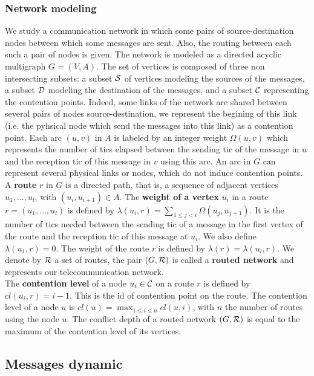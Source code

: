 \documentclass[english]{article}
\begin{document}
  \subsubsection{Network modeling}
  We study a communication network in which some pairs of source-destination nodes between which some messages are sent. Also, the routing between each such a pair of nodes is given.
The network is modeled as a directed acyclic multigraph $G=(V,A)$. The set of vertices is composed of three non intersecting subsets: a subset $\cal{S}$ of vertices modeling the sources of the messages, a subset $\cal{D}$ modeling the destination of the messages, and a subset $\cal{C}$ representing the contention points. Indeed, some links of the network are shared between several pairs of nodes source-destination, we represent the begining of this link (i.e. the pyhsical node which send the messages into this link) as a contention point. Each arc  $(u,v)$ in $A$ is labeled by an integer weight $\Omega(u,v)$ which represents the number of tics elapsed between the sending tic of the message in $u$ and the reception tic of this message in $v$ using this arc. An arc in $G$ can represent several physical links or nodes, which do not induce contention points.\\
  A {\bf route} $r$ in $G$ is a directed path, that is, a sequence of adjacent vertices $u_1, \ldots , u_{l}$, with $(u_i,u_{i+1}) \in A$.  The {\bf weight of a vertex} $u_i$ in a route $r=(u_1,\dots,u_l)$ is defined by $\lambda(u_i,r)= \sum\limits_{1 \leq j <i} \Omega(u_j, u_{j+1})$. It is the number of tics needed between the sending tic of a message in the first vertex of the route and the reception tic of this message at $u_i$. We also define $\lambda(u_1,r)=0$. The weight of the route $r$ is defined by $\lambda (r)= \lambda (u_l,r)$.
We denote by $\cal R$ a set of routes, the pair $(G,\cal R)$ is called a {\bf routed network} and represents our telecommunication network.\\
The \textbf{contention level} of a node $u_i \in \cal{C}$ on a route $r$ is defined by $cl(u_i,r) = i-1$. This is the id of contention point on the route. The contention level of a node $u$ is $cl(u) = \max_{1\leq i\leq n} cl(u,i)$, with $n$ the number of routes using the node $u$.
The conflict depth of a routed network $(G,\cal{R})$ is equal to the maximum of the contention level of its vertices.
 \subsection{Messages dynamic}
	     
\end{document}
